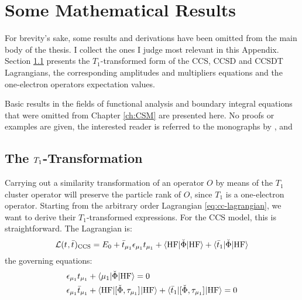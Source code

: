 \chapter{Some Mathematical Results}\label{app:mathematical-results}

\begin{epigraphs}
\end{epigraphs}

For brevity's sake, some results and derivations have been omitted from the main
body of the thesis. I collect the ones I judge most relevant in this Appendix.
Section \ref{sec:T1-cc} presents the $T_1$-transformed form of the
\acrshort{CCS}, \acrshort{CCSD} and \acrshort{CCSDT} Lagrangians, the corresponding amplitudes
and multipliers equations and the one-electron operators expectation values.

Basic results in the fields of functional analysis and boundary integral
equations that were omitted from Chapter \ref{ch:CSM} are presented here.
No proofs or examples are given, the interested reader is referred to the
monographs by \citeauthor{Ern2004-oo}, \citeauthor{Hsiao2008-xb} and
\citeauthor{Sauter2011-an}\autocite{Ern2004-oo, Hsiao2008-xb, Sauter2011-an}

\section{The \texorpdfstring{$\T1$}{T1}-Transformation}\label{sec:T1-cc}

Carrying out a similarity transformation of
an operator $O$ by means of the $T_1$ cluster operator will preserve the particle
rank of $O$, since $T_1$ is a one-electron operator.\autocite{Koch1994-vr}
Starting from the arbitrary order Lagrangian \eqref{eq:cc-lagrangian},
we want to derive their $T_1$-transformed
expressions.
For the \acrshort{CCS} model, this is straightforward.
The Lagrangian is:
\begin{equation}\label{eq:ccs-lagrangian}
 \mathcal{L}(t_{}, \bar{t}_{})_\mathrm{CCS}
 =
  E_0
  + \bar{t}_{\mu_1}\epsilon_{\mu_1}t_{\mu_1}
  + \braket{\mathrm{HF} | \check{\Phi} | \mathrm{HF}}
  + \braket{\bar{t}_{1} | \check{\Phi} | \mathrm{HF}}
\end{equation}
the governing equations:
\begin{subequations}\label{eq:ccs-equations}
  \begin{align}
   \epsilon_{\mu_1}t_{\mu_1} &+ \braket{\mu_1 | \check{\Phi} | \mathrm{HF}}
             = 0 \label{eq:ccs-amplitudes}\\
    \epsilon_{\mu_1}\bar{t}_{\mu_1} &+
    \braket{\mathrm{HF} | [ \check{\Phi}, \tau_{\mu_1} ]^{} | \mathrm{HF}} +
    \braket{\bar{t}_{1} |
    [ \check{\Phi}, \tau_{\mu_1} ]^{} | \mathrm{HF}}
             = 0 \label{eq:ccs-multipliers}
  \end{align}
\end{subequations}

